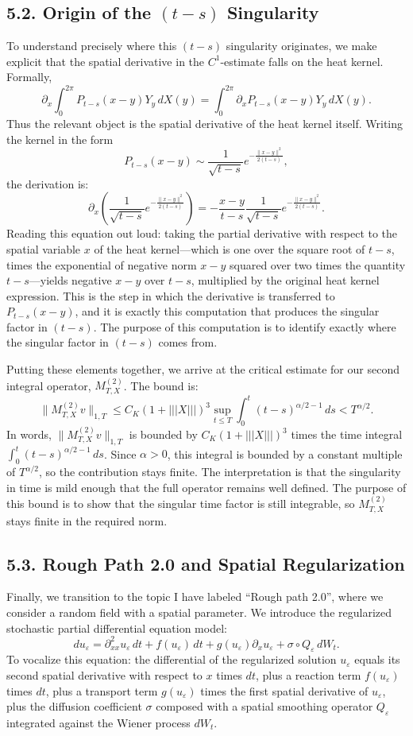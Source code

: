 \documentclass[11pt]{article}
\theoremstyle{definition}
\theoremstyle{remark}
\begin{document}
\subsection*{5.2. Origin of the $(t-s)$ Singularity}
To understand precisely where this $(t-s)$ singularity originates, we make explicit that the spatial derivative in the $C^1$-estimate falls on the heat kernel. Formally,
\[
\partial_x\int_0^{2\pi} P_{t-s}(x-y)Y_y\,dX(y)
=
\int_0^{2\pi} \partial_x P_{t-s}(x-y)Y_y\,dX(y).
\]
Thus the relevant object is the spatial derivative of the heat kernel itself. Writing the kernel in the form
\[
P_{t-s}(x-y)\sim \frac{1}{\sqrt{t-s}}e^{-\frac{\|x-y\|^2}{2(t-s)}},
\]
the derivation is:
\[
\partial_x\!\left(\frac{1}{\sqrt{t-s}}e^{-\frac{\|x-y\|^2}{2(t-s)}}\right)
=-\frac{x-y}{t-s}\frac{1}{\sqrt{t-s}}e^{-\frac{\|x-y\|^2}{2(t-s)}}.
\]
Reading this equation out loud: taking the partial derivative with respect to the spatial variable $x$ of the heat kernel---which is one over the square root of $t-s$, times the exponential of negative norm $x-y$ squared over two times the quantity $t-s$---yields negative $x-y$ over $t-s$, multiplied by the original heat kernel expression. This is the step in which the derivative is transferred to $P_{t-s}(x-y)$, and it is exactly this computation that produces the singular factor in $(t-s)$.
The purpose of this computation is to identify exactly where the singular factor in $(t-s)$ comes from.

Putting these elements together, we arrive at the critical estimate for our second integral operator, $M_{T,X}^{(2)}$. The bound is:
\[
\|M_{T,X}^{(2)}v\|_{1,T}
\le C_K(1+|||X|||)^3
\sup_{t\le T}\int_0^t (t-s)^{\alpha/2-1}\,ds
< T^{\alpha/2}.
\]
In words, $\|M_{T,X}^{(2)}v\|_{1,T}$ is bounded by $C_K(1+|||X|||)^3$ times the time integral $\int_0^t (t-s)^{\alpha/2-1}\,ds$. Since $\alpha>0$, this integral is bounded by a constant multiple of $T^{\alpha/2}$, so the contribution stays finite.
The interpretation is that the singularity in time is mild enough that the full operator remains well defined.
The purpose of this bound is to show that the singular time factor is still integrable, so $M_{T,X}^{(2)}$ stays finite in the required norm.

\subsection*{5.3. Rough Path 2.0 and Spatial Regularization}
Finally, we transition to the topic I have labeled ``Rough path 2.0'', where we consider a random field with a spatial parameter. We introduce the regularized stochastic partial differential equation model:
\[
du_{\varepsilon}
=\partial_{xx}^2u_{\varepsilon}\,dt+f(u_{\varepsilon})\,dt+g(u_{\varepsilon})\partial_xu_{\varepsilon}+\sigma\circ Q_{\varepsilon}\,dW_t.
\]
To vocalize this equation: the differential of the regularized solution $u_{\varepsilon}$ equals its second spatial derivative with respect to $x$ times $dt$, plus a reaction term $f(u_{\varepsilon})$ times $dt$, plus a transport term $g(u_{\varepsilon})$ times the first spatial derivative of $u_{\varepsilon}$, plus the diffusion coefficient $\sigma$ composed with a spatial smoothing operator $Q_{\varepsilon}$ integrated against the Wiener process $dW_t$.
\end{document}
